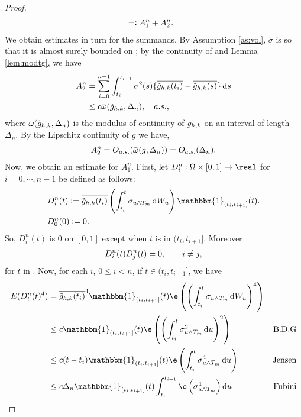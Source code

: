 \begin{proof}
\begin{align}
  &=:A_{1}^n + A_{2}^n \notag.
  \label{}
\end{align}
We obtain estimates in turn for the summands. By Assumption \ref{as:vol}, $\sigma$ is \cadlag so that it is almost surely  bounded on \domain;  by the continuity of \tghk   and Lemma \eqref{lem:modtg}, we have 
\begin{align}
  A_{2}^n &= \sumin \int_{t_i}^{t_{i+1}} \sigma^2(s)  \{\btghki - \btghks\} \D s\notag\\
  &\le c\modc{\tghk}{\Delta_n},\quad a.s.,\notag
  \label{}
\end{align}
where ${\bar{\omega}}({\tilde{g}_{h,k}},\Delta_n)$ is the modulus of continuity of $\tilde{g}_{h,k}$ on an interval of length $\Delta_n$.  By the Lipschitz continuity of $g$ we have, 
\begin{align}
  A_{2}^n = O_{a.s.}({\bar{\omega}}({g},\Delta_n)) = O_{a.s.}( \Delta_n). \notag 
  \label{}
\end{align}
Now, we obtain an estimate for $A_{1}^n$.
First, let $D_i^n: \Omega\times[0,1] \to \real$ for $i = 0, \cdots, n-1$ be defined as follows:  
\begin{align}
&D_{i}^n(t) := \btghki\left(\int_{t_i}^{t} \sigma_{u \wedge T_m}\D W_u\right)\mathbbm{1}_{(t_i, t_{i+1}]}(t).
  \label{eq:Di}\\
&D_0^n(0) := 0.
\end{align}
So, $D_i^n(t)$ is 0 on $[0,1]$ except when $t$ is in $(t_i, t_{i+1}]$. Moreover   
\begin{align}
  D_i^n (t) D_j^n(t) = 0, \qquad i \not = j,\notag
  \label{}
\end{align}
for $t$ in \domain. Now, for each  $i$, $0 \le i < n$, if    $t \in (t_i, t_{i+1}]$, we have  
\begin{align}
E(D_i^n(t)^4) &= \btghki^4\mathbbm{1}_{(t_i, t_{i+1}]}(t)\e\left( \left(\int_{t_i}^{t} \sigma_{u\wedge T_m}\D W_u\right)^4\right)& \notag\\
& \le c\mathbbm{1}_{(t_i, t_{i+1}]}(t)\e\left( \left(\int_{t_i}^{t} \sigma_{u\wedge T_m}^2\D u\right)^2\right) &\text{B.D.G}\notag\\
& \le c(t - t_i)\mathbbm{1}_{(t_i, t_{i+1}]}(t) \e \left(\int_{t_i}^{t} \sigma_{u\wedge T_m}^4\D u\right)&\text{Jensen}\notag\\
  & \le c\Delta_n\mathbbm{1}_{(t_i, t_{i+1}]}(t)\int_{t_i}^{t_{i+1}} \e\left(\sigma_{u\wedge T_m}^4\right) \D u &\text{Fubini}\notag \\

\end{align}
\end{proof}
